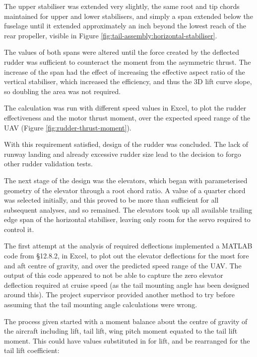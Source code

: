 \documentclass[../../main.tex]{subfiles}
\begin{document}
The upper stabiliser was extended very slightly, the same root and tip chords maintained for upper and lower stabilisers, and simply a span extended below the fuselage until it extended approximately an inch beyond the lowest reach of the rear propeller, visible in Figure \ref{fig:tail-assembly:horizontal-stabiliser}.  %

The values of both spans were altered until the force created by the deflected rudder was sufficient to counteract the moment from the asymmetric thrust.
The increase of the span had the effect of increasing the effective aspect ratio of the vertical stabiliser, which increased the efficiency, and thus the 3D lift curve slope, so doubling the area was not required. 

The calculation was run with different speed values in Excel, to plot the rudder effectiveness and the motor thrust moment, over the expected speed range of the UAV (Figure \ref{fig:rudder-thrust-moment}).


With this requirement satisfied, design of the rudder was concluded.
The lack of runway landing and already excessive rudder size lead to the decision to forgo other rudder validation tests. 

The next stage of the design was the elevators, which began with parameterised geometry of the elevator through a root chord ratio.
A value of a quarter chord was selected initially, and this proved to be more than sufficient for all subsequent analyses, and so remained.
The elevators took up all available trailing edge span of the horizontal stabiliser, leaving only room for the servo required to control it.  

The first attempt at the analysis of required deflections implemented a MATLAB code from \cite{sadraey-13} \S 12.8.2, in Excel, to plot out the elevator deflections for the most fore and aft centre of gravity, and over the predicted speed range of the UAV.
The output of this code appeared to not be able to capture the zero elevator deflection required at cruise speed (as the tail mounting angle has been designed around this).
The project supervisor provided another method to try before assuming that the tail mounting angle calculations were wrong.  

The process given started with a moment balance about the centre of gravity of the aircraft including lift, tail lift, wing pitch moment equated to the tail lift moment.
This could have values substituted in for lift, and be rearranged for the tail lift coefficient: 
\end{document}
